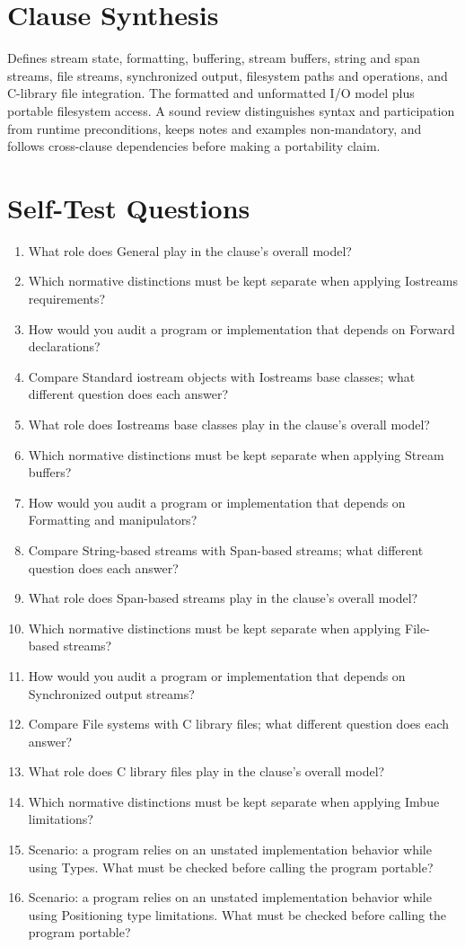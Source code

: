 \documentclass[11pt,letterpaper]{article}
\begin{document}
\section{Clause Synthesis}
\begin{CornellReferenceOrientationBox}Defines stream state, formatting, buffering, stream buffers, string and span streams, file streams, synchronized output, filesystem paths and operations, and C-library file integration. The formatted and unformatted I/O model plus portable filesystem access. A sound review distinguishes syntax and participation from runtime preconditions, keeps notes and examples non-mandatory, and follows cross-clause dependencies before making a portability claim.\end{CornellReferenceOrientationBox}
\section{Self-Test Questions}
\begin{enumerate}
\item What role does General play in the clause's overall model?
\item Which normative distinctions must be kept separate when applying Iostreams requirements?
\item How would you audit a program or implementation that depends on Forward declarations?
\item Compare Standard iostream objects with Iostreams base classes; what different question does each answer?
\item What role does Iostreams base classes play in the clause's overall model?
\item Which normative distinctions must be kept separate when applying Stream buffers?
\item How would you audit a program or implementation that depends on Formatting and manipulators?
\item Compare String-based streams with Span-based streams; what different question does each answer?
\item What role does Span-based streams play in the clause's overall model?
\item Which normative distinctions must be kept separate when applying File-based streams?
\item How would you audit a program or implementation that depends on Synchronized output streams?
\item Compare File systems with C library files; what different question does each answer?
\item What role does C library files play in the clause's overall model?
\item Which normative distinctions must be kept separate when applying Imbue limitations?
\item Scenario: a program relies on an unstated implementation behavior while using Types. What must be checked before calling the program portable?
\item Scenario: a program relies on an unstated implementation behavior while using Positioning type limitations. What must be checked before calling the program portable?
\end{enumerate}
\end{document}
